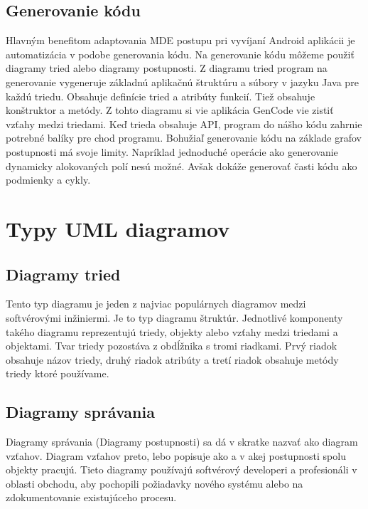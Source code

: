 \documentclass[10pt,twoside,slovak,a4paper]{article}
\begin{document}
\subsection{Generovanie kódu}\label{Generovanie kódu}
Hlavným benefitom adaptovania MDE postupu pri vyvíjaní Android aplikácii je automatizácia v podobe generovania kódu. Na generovanie kódu môžeme použiť diagramy tried alebo diagramy postupnosti.\newline
Z diagramu tried program na generovanie vygeneruje základnú aplikačnú štruktúru a súbory v jazyku Java pre každú triedu. Obsahuje definície tried a atribúty funkcií. Tiež obsahuje konštruktor a metódy. Z tohto diagramu si vie aplikácia GenCode vie zistiť vzťahy medzi triedami. Keď trieda obsahuje API, program do nášho kódu zahrnie potrebné balíky pre chod programu.\newline
Bohužiaľ generovanie kódu na základe grafov postupnosti má svoje limity. Napríklad jednoduché operácie ako generovanie dynamicky alokovaných polí nesú možné. Avšak dokáže generovať časti kódu ako podmienky a cykly.



\section{Typy UML diagramov} \label{Typy UML diagramov}
    \subsection{Diagramy tried}\label{Typy UML diagramov:Diagramy správania}
    Tento typ diagramu je jeden z najviac populárnych diagramov medzi softvérovými inžiniermi. Je to typ diagramu štruktúr. Jednotlivé komponenty takého diagramu reprezentujú triedy, objekty alebo vzťahy medzi triedami a objektami.\newline
    Tvar triedy pozostáva z obdĺžnika s tromi riadkami. Prvý riadok obsahuje názov triedy, druhý riadok atribúty a tretí riadok obsahuje metódy triedy ktoré používame. 

    \subsection{Diagramy správania}\label{Typy UML diagramov:Diagramy štruktúry}
    Diagramy správania (Diagramy postupnosti) sa dá v skratke nazvať ako diagram vzťahov. Diagram vzťahov preto, lebo popisuje ako a v akej postupnosti spolu objekty pracujú.\newline
    Tieto diagramy používajú softvérový developeri a profesionáli v oblasti obchodu, aby pochopili požiadavky nového systému alebo na zdokumentovanie existujúceho procesu. 
\end{document}

